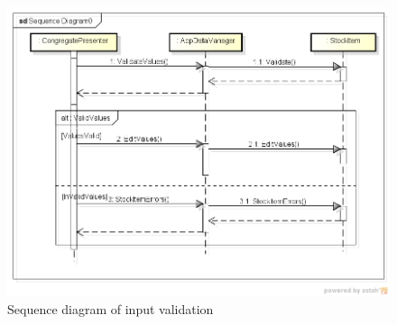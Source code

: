 \begin{figure}[H]
\begin{center}
\includegraphics[width=\textwidth]{gfx/error_handling.png}
\caption{Sequence diagram of input validation}
\label{fig:error_handling}
\end{center}
\end{figure}